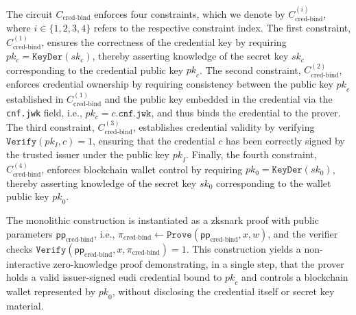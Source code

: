 \medskip
The circuit $C_{\text{cred-bind}}$ enforces four constraints, which we denote by $C_{\text{cred-bind}}^{(i)}$, where $i \in \{1,2,3,4\}$ refers to the respective constraint index. The first constraint, $C_{\text{cred-bind}}^{(1)}$, ensures the correctness of the credential key by requiring $pk_c = \texttt{KeyDer}(sk_c)$, thereby asserting knowledge of the secret key $\mathit{sk}_c$ corresponding to the credential public key $\mathit{pk}_c$. The second constraint, $C_{\text{cred-bind}}^{(2)}$, enforces credential ownership by requiring consistency between the public key $\mathit{pk}_c$ established in $C_{\text{cred-bind}}^{(1)}$ and the public key embedded in the credential via the \texttt{cnf.jwk} field, i.e., $pk_c = c.\texttt{cnf.jwk}$, and thus binds the credential to the prover. The third constraint, $C_{\text{cred-bind}}^{(3)}$, establishes credential validity by verifying $\texttt{Verify}(pk_I, c) = 1$, ensuring that the credential $c$ has been correctly signed by the trusted issuer under the public key $\mathit{pk}_I$. Finally, the fourth constraint, $C_{\text{cred-bind}}^{(4)}$, enforces blockchain wallet control by requiring $pk_0 = \texttt{KeyDer}(sk_0)$, thereby asserting knowledge of the secret key $\mathit{sk}_0$ corresponding to the wallet public key $\mathit{pk}_0$. 

\medskip
The monolithic construction is instantiated as a \acrshort{zksnark} proof with public parameters $\mathsf{pp}_{\text{cred-bind}}$, i.e., $\pi_{\text{cred-bind}} \leftarrow \texttt{Prove}(\mathsf{pp}_{\text{cred-bind}}, x, w)$, and the verifier checks $\texttt{Verify}(\mathsf{pp}_{\text{cred-bind}}, x, \pi_{\text{cred-bind}}) = 1$. This construction yields a non-interactive zero-knowledge proof demonstrating, in a single step, that the prover holds a valid issuer-signed \acrshort{eudi} credential bound to $\mathit{pk}_c$ and controls a blockchain wallet represented by $\mathit{pk}_0$, without disclosing the credential itself or secret key material. 

